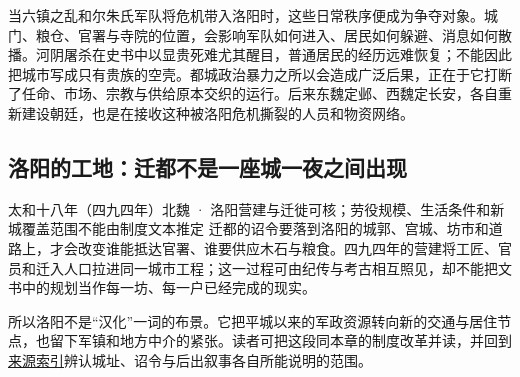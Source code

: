 当六镇之乱和尔朱氏军队将危机带入洛阳时，这些日常秩序便成为争夺对象。城门、粮仓、官署与寺院的位置，会影响军队如何进入、居民如何躲避、消息如何散播。河阴屠杀在史书中以显贵死难尤其醒目，普通居民的经历远难恢复；不能因此把城市写成只有贵族的空壳。都城政治暴力之所以会造成广泛后果，正在于它打断了任命、市场、宗教与供给原本交织的运行。后来东魏定邺、西魏定长安，各自重新建设朝廷，也是在接收这种被洛阳危机撕裂的人员和物资网络。

\subsection{洛阳的工地：迁都不是一座城一夜之间出现}
\begin{event}{}{太和十八年（四九四年）}{北魏 · 洛阳}{营建与迁徙可核；劳役规模、生活条件和新城覆盖范围不能由制度文本推定}
迁都的诏令要落到洛阳的城郭、宫城、坊市和道路上，才会改变谁能抵达官署、谁要供应木石与粮食。四九四年的营建将工匠、官员和迁入人口拉进同一城市工程；这一过程可由纪传与考古相互照见，却不能把文书中的规划当作每一坊、每一户已经完成的现实。

所以洛阳不是“汉化”一词的布景。它把平城以来的军政资源转向新的交通与居住节点，也留下军镇和地方中介的紧张。读者可把这段同本章的制度改革并读，并回到\hyperref[app:sources]{来源索引}辨认城址、诏令与后出叙事各自所能说明的范围。
\end{event}